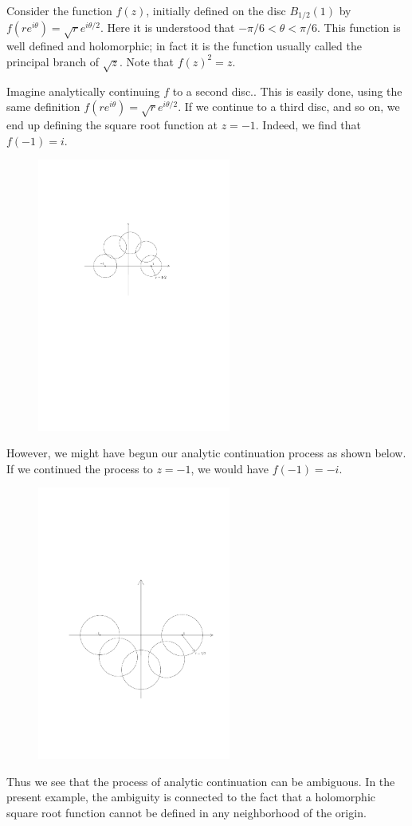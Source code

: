 \begin{example}\label{squre root continuation}
Consider the function $f(z)$, initially defined on the disc $B_{1/2}(1)$ by $f(re^{i\theta})=\sqrt{r}e^{i\theta/2}$. Here it is understood that $-\pi/6<\theta<\pi/6$. This function is well defined and holomorphic; in fact it is the function usually called the principal branch of $\sqrt{z}$. Note that $f(z)^2=z$.\par
Imagine analytically continuing $f$ to a second disc.. This is easily done, using the same definition $f(re^{i\theta})=\sqrt{r}e^{i\theta/2}$. If we continue to a third disc, and so on, we end up defining the square root function at $z=-1$. Indeed, we find that $f(-1)=i$.
\begin{figure}[htbp]
\centering
\includegraphics[width=180pt]{pictures/analytic-continuation-squreroot-1}
\end{figure}

However, we might have begun our analytic continuation process as shown below. If we continued the process to $z=-1$, we would have $f(-1)=-i$.
\begin{figure}[htbp]
\centering
\includegraphics[width=180pt]{pictures/analytic-continuation-squreroot-2}
\end{figure}

Thus we see that the process of analytic continuation can be ambiguous. In the present example, the ambiguity is connected to the fact that a holomorphic square root function cannot be defined in any neighborhood of the origin.
\end{example}
